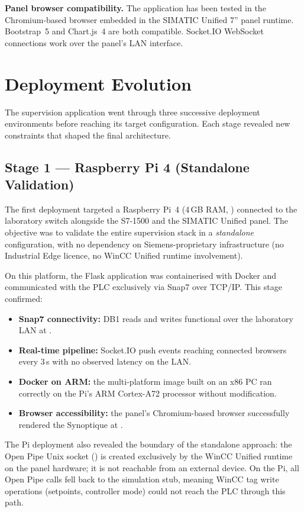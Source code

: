 \textbf{Panel browser compatibility.}
The application has been tested in the Chromium-based browser embedded in the SIMATIC
Unified 7\textquotedblright{} panel runtime. Bootstrap~5 and Chart.js~4 are both
compatible. Socket.IO WebSocket connections work over the panel's LAN interface.

\section{Deployment Evolution}
\label{sec:deploy_evolution}

The supervision application went through three successive deployment environments before
reaching its target configuration. Each stage revealed new constraints that shaped the
final architecture.

\subsection{Stage 1 --- Raspberry Pi 4 (Standalone Validation)}

The first deployment targeted a Raspberry Pi~4 (4\,GB RAM, ) connected
to the laboratory switch alongside the S7-1500 and the SIMATIC Unified panel.
The objective was to validate the entire supervision stack in a \emph{standalone}
configuration, with no dependency on Siemens-proprietary infrastructure
(no Industrial Edge licence, no WinCC Unified runtime involvement).

On this platform, the Flask application was containerised with Docker and communicated
with the PLC exclusively via Snap7 over TCP/IP. This stage confirmed:
\begin{itemize}[leftmargin=*, itemsep=3pt]
  \item \textbf{Snap7 connectivity:} DB1 reads and writes functional over the laboratory
    LAN at .
  \item \textbf{Real-time pipeline:} Socket.IO push events reaching connected browsers
    every 3\,s with no observed latency on the LAN.
  \item \textbf{Docker on ARM:} the multi-platform image built on an x86 PC
    ran correctly on the Pi's ARM Cortex-A72 processor without modification.
  \item \textbf{Browser accessibility:} the panel's Chromium-based browser successfully
    rendered the Synoptique at .
\end{itemize}

The Pi deployment also revealed the boundary of the standalone approach:
the Open Pipe Unix socket () is created exclusively by
the WinCC Unified runtime on the panel hardware; it is not reachable from an
external device. On the Pi, all Open Pipe calls fell back to the simulation stub,
meaning WinCC tag write operations (setpoints, controller mode) could not reach the PLC
through this path.

